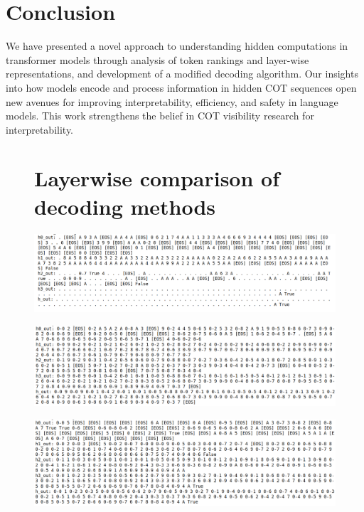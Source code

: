 \documentclass[10pt,a4paper]{article}
\begin{document}
\clearpage
\section{Conclusion}
We have presented a novel approach to understanding hidden computations in transformer models through analysis of token rankings and layer-wise representations, and development of a modified decoding algorithm. Our insights into how models encode and process information in hidden COT sequences open new avenues for improving interpretability, efficiency, and safety in language models. This work strengthens the belief in COT visibility research for interpretability.

\appendix
\begin{figure}[p]
    \centering
    \section{Layerwise comparison of decoding methods}
    \vspace{-0.5em}  %
    
    \includegraphics[width=\textwidth,height=0.19\textheight,keepaspectratio]{greedy_decoding.png}
    \label{fig:greedy}
    
    \vspace{0.5em}
    
    \includegraphics[width=\textwidth,height=0.19\textheight,keepaspectratio]{rank2_decoding.png}
    \label{fig:rank2}
    
    \vspace{0.5em}
    
    \includegraphics[width=\textwidth,height=0.19\textheight,keepaspectratio]{our_method_decoding.png}
    \label{fig:our-method}
    

\end{figure}
\end{document}
